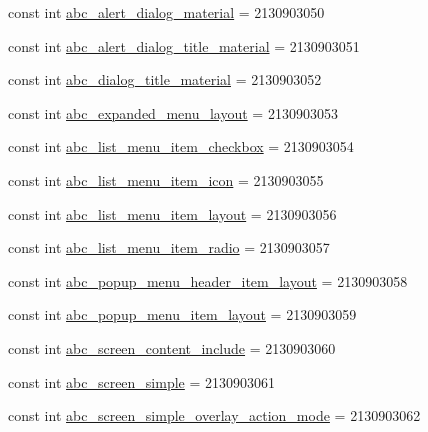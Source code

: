 \begin{CompactItemize}
\item 
const int \hyperlink{class__2doo_1_1_droid_1_1_resource_1_1_layout_4df7cd0829d931ff8868cce6cab36fdd}{abc\_\-alert\_\-dialog\_\-material} = 2130903050
\item 
const int \hyperlink{class__2doo_1_1_droid_1_1_resource_1_1_layout_72496d90fc926007d6eb92a4156eff20}{abc\_\-alert\_\-dialog\_\-title\_\-material} = 2130903051
\item 
const int \hyperlink{class__2doo_1_1_droid_1_1_resource_1_1_layout_baed66eb7bd77ebc31afdf022e57b0b9}{abc\_\-dialog\_\-title\_\-material} = 2130903052
\item 
const int \hyperlink{class__2doo_1_1_droid_1_1_resource_1_1_layout_7ce413452e3e64e57fe87da69cefd38e}{abc\_\-expanded\_\-menu\_\-layout} = 2130903053
\item 
const int \hyperlink{class__2doo_1_1_droid_1_1_resource_1_1_layout_58cb2b6f8799d54855e1bbf401b64183}{abc\_\-list\_\-menu\_\-item\_\-checkbox} = 2130903054
\item 
const int \hyperlink{class__2doo_1_1_droid_1_1_resource_1_1_layout_b0b4b66952c10a81acbb51ad08c27e4b}{abc\_\-list\_\-menu\_\-item\_\-icon} = 2130903055
\item 
const int \hyperlink{class__2doo_1_1_droid_1_1_resource_1_1_layout_2a79d69c54a6551b19a9e8eb365fc72a}{abc\_\-list\_\-menu\_\-item\_\-layout} = 2130903056
\item 
const int \hyperlink{class__2doo_1_1_droid_1_1_resource_1_1_layout_c1dc2404bf1899c1b57080a67a5f9a8d}{abc\_\-list\_\-menu\_\-item\_\-radio} = 2130903057
\item 
const int \hyperlink{class__2doo_1_1_droid_1_1_resource_1_1_layout_4822ce60c50053411cc79fb792097848}{abc\_\-popup\_\-menu\_\-header\_\-item\_\-layout} = 2130903058
\item 
const int \hyperlink{class__2doo_1_1_droid_1_1_resource_1_1_layout_a5498457ead0b25ed9f519418d24c2a3}{abc\_\-popup\_\-menu\_\-item\_\-layout} = 2130903059
\item 
const int \hyperlink{class__2doo_1_1_droid_1_1_resource_1_1_layout_cd4275d1156a17e594a413ef179dde19}{abc\_\-screen\_\-content\_\-include} = 2130903060
\item 
const int \hyperlink{class__2doo_1_1_droid_1_1_resource_1_1_layout_edeaed45bd4524a1674a765eb0295aea}{abc\_\-screen\_\-simple} = 2130903061
\item 
const int \hyperlink{class__2doo_1_1_droid_1_1_resource_1_1_layout_1987f22acc231b8b496d21a59d54b41f}{abc\_\-screen\_\-simple\_\-overlay\_\-action\_\-mode} = 2130903062

\end{CompactItemize}
